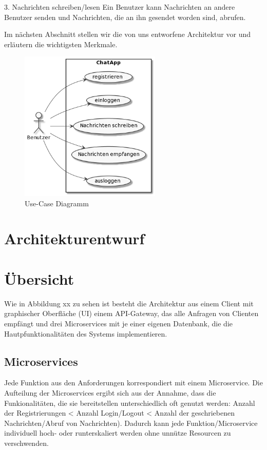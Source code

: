 3. Nachrichten schreiben/lesen
Ein Benutzer kann Nachrichten an andere Benutzer senden und Nachrichten, die an ihn gesendet worden sind, abrufen.


Im nächsten Abschnitt stellen wir die von uns entworfene Architektur vor und erläutern die wichtigsten Merkmale. 

\begin{figure}[bth] 
	\centering
	\includegraphics[width=0.6\textwidth]{Graphics/Usecase-Diagramm.png}
	\caption{Use-Case Diagramm}
\end{figure}

\section{Architekturentwurf}

\section{Übersicht}
Wie in Abbildung xx zu sehen ist besteht die Architektur aus einem Client mit graphischer Oberfläche (UI) einem API-Gateway, das alle Anfragen von Clienten empfängt und drei Microservices mit je einer eigenen Datenbank, die die Hautpfunktionalitäten des Systems implementieren.

\subsection{Microservices}
Jede Funktion aus den Anforderungen korrespondiert mit einem Microservice. Die Aufteilung der Microservices ergibt sich aus der Annahme, dass die Funkionalitäten, die sie bereitstellen unterschiedlich oft genutzt werden: Anzahl der Registrierungen < Anzahl Login/Logout < Anzahl der geschriebenen Nachrichten/Abruf von Nachrichten). Dadurch kann jede Funktion/Microservice individuell hoch- oder runterskaliert werden ohne unnütze Resourcen zu verschwenden.

